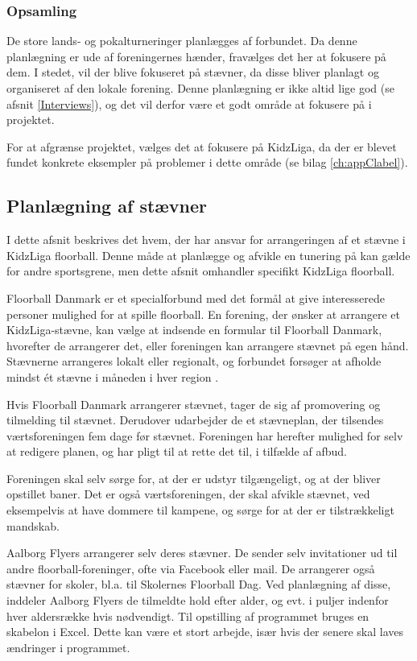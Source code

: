 \subsubsection*{Opsamling}
De store lands- og pokalturneringer planlægges af forbundet. Da denne planlægning er ude af foreningernes hænder, fravælges det her at fokusere på dem. I stedet, vil der blive fokuseret på stævner, da disse bliver planlagt og organiseret af den lokale forening. Denne planlægning er ikke altid lige god (se afsnit \ref{Interviews}), og det vil derfor være et godt område at fokusere på i projektet.
\par
For at afgrænse projektet, vælges det at fokusere på KidzLiga, da der er blevet fundet konkrete eksempler på problemer i dette område (se bilag \ref{ch:appClabel}). 

\subsection{Planlægning af stævner}
I dette afsnit beskrives det hvem, der har ansvar for arrangeringen af et stævne i KidzLiga floorball. Denne måde at planlægge og afvikle en tunering på kan gælde for andre sportsgrene, men dette afsnit omhandler specifikt KidzLiga floorball.
\par
Floorball Danmark er et specialforbund med det formål at give interesserede personer mulighed for at spille floorball. En forening, der ønsker at arrangere et KidzLiga-stævne, kan vælge at indsende en formular til Floorball Danmark, hvorefter de arrangerer det, eller foreningen kan arrangere stævnet på egen hånd. Stævnerne arrangeres lokalt eller regionalt, og forbundet forsøger at afholde mindst ét stævne i måneden i hver region \citep{kidzRegler}.
\par
Hvis Floorball Danmark arrangerer stævnet, tager de sig af promovering og tilmelding til stævnet. Derudover udarbejder de et stævneplan, der tilsendes værtsforeningen fem dage før stævnet. Foreningen har herefter mulighed for selv at redigere planen, og har pligt til at rette det til, i tilfælde af afbud.
\par
Foreningen skal selv sørge for, at der er udstyr tilgængeligt, og at der bliver opstillet baner. Det er også værtsforeningen, der skal afvikle stævnet, ved eksempelvis at have dommere til kampene, og sørge for at der er tilstrækkeligt mandskab\citep{kidzRegler}. 
\par
Aalborg Flyers arrangerer selv deres stævner. De sender selv invitationer ud til andre floorball-foreninger, ofte via Facebook eller mail. De arrangerer også stævner for skoler, bl.a. til Skolernes Floorball Dag. Ved planlægning af disse, inddeler Aalborg Flyers de tilmeldte hold efter alder, og evt. i puljer indenfor hver aldersrække hvis nødvendigt. Til opstilling af programmet bruges en skabelon i Excel. Dette kan være et stort arbejde, især hvis der senere skal laves ændringer i programmet.

